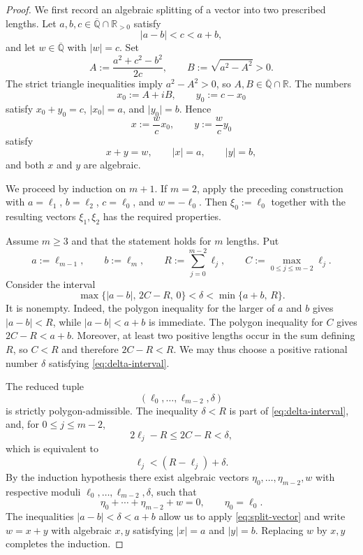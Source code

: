 \documentclass[10pt]{amsart}
\theoremstyle{definition}
\theoremstyle{remark}
\numberwithin{equation}{section}
\newcommand{\R}{\mathbb R}
\newcommand{\Qbar}{\overline{\mathbb Q}}
\newcommand{\abs}[1]{\lvert #1\rvert}
\begin{document}
\begin{proof}
We first record an algebraic splitting of a vector into two prescribed
lengths. Let $a,b,c\in\Qbar\cap\R_{>0}$ satisfy
\[
        \abs{a-b}<c<a+b,
\]
and let $w\in\Qbar$ with $\abs w=c$. Set
\[
        A:=\frac{a^2+c^2-b^2}{2c},
        \qquad
        B:=\sqrt{a^2-A^2}>0.
\]
The strict triangle inequalities imply $a^2-A^2>0$, so $A,B\in\Qbar\cap \R$.
The numbers
\[
        x_0:=A+iB,
        \qquad
        y_0:=c-x_0
\]
satisfy $x_0+y_0=c$, $\abs{x_0}=a$, and $\abs{y_0}=b$. Hence
\begin{equation}\label{eq:split-vector}
        x:=\frac{w}{c}x_0,
        \qquad
        y:=\frac{w}{c}y_0
\end{equation}
satisfy
\[
        x+y=w,
        \qquad
        \abs x=a,
        \qquad
        \abs y=b,
\]
and both $x$ and $y$ are algebraic.

We proceed by induction on $m+1$. If $m=2$, apply the preceding construction
with $a=\ell_1$, $b=\ell_2$, $c=\ell_0$, and $w=-\ell_0$. Then
$\xi_0:=\ell_0$ together with the resulting vectors $\xi_1,\xi_2$ has the
required properties.

Assume $m\geq3$ and that the statement holds for $m$ lengths. Put
\[
        a:=\ell_{m-1},
        \qquad
        b:=\ell_m,
        \qquad
        R:=\sum_{j=0}^{m-2}\ell_j,
        \qquad
        C:=\max_{0\leq j\leq m-2}\ell_j.
\]
Consider the interval
\begin{equation}\label{eq:delta-interval}
        \max\{\abs{a-b},\,2C-R,\,0\}
        <\delta<
        \min\{a+b,\,R\}.
\end{equation}
It is nonempty. Indeed, the polygon inequality for the larger of $a$ and
$b$ gives $\abs{a-b}<R$, while $\abs{a-b}<a+b$ is immediate. The polygon
inequality for $C$ gives $2C-R<a+b$. Moreover, at least two positive lengths
occur in the sum defining $R$, so $C<R$ and therefore $2C-R<R$. We may thus
choose a positive rational number $\delta$ satisfying
\eqref{eq:delta-interval}.

The reduced tuple
\[
        (\ell_0,\ldots,\ell_{m-2},\delta)
\]
is strictly polygon-admissible. The inequality $\delta<R$ is part of
\eqref{eq:delta-interval}, and, for $0\leq j\leq m-2$,
\[
        2\ell_j-R\leq2C-R<\delta,
\]
which is equivalent to
\[
        \ell_j<(R-\ell_j)+\delta.
\]
By the induction hypothesis there exist algebraic vectors
$\eta_0,\ldots,\eta_{m-2},w$ with respective moduli
$\ell_0,\ldots,\ell_{m-2},\delta$, such that
\[
        \eta_0+\cdots+\eta_{m-2}+w=0,
        \qquad
        \eta_0=\ell_0.
\]
The inequalities $\abs{a-b}<\delta<a+b$ allow us to apply
\eqref{eq:split-vector} and write $w=x+y$ with algebraic $x,y$ satisfying
$\abs x=a$ and $\abs y=b$. Replacing $w$ by $x,y$ completes the induction.
\end{proof}
\end{document}
